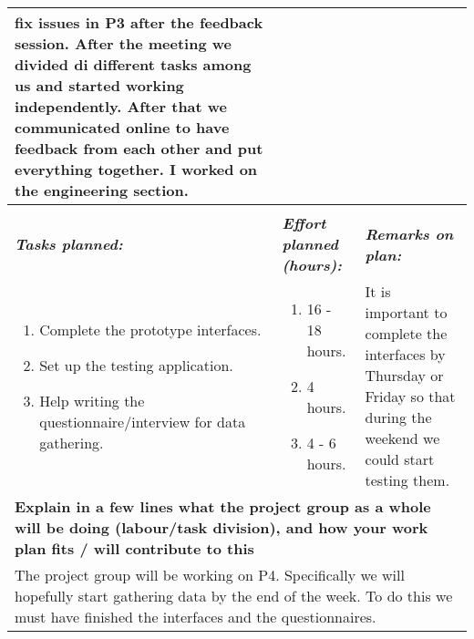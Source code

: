 \documentclass[a4paper]{article}
\begin{document}
\begin{center}
\begin{tabular}{ | p{6cm} | p{6cm} | p{6cm} | p{6cm} | }
{    fix issues in P3 after the feedback session. After the meeting we divided
    di different tasks among us and started working independently. After that
    we communicated online to have feedback from each other and put everything
    together. I worked on the engineering section.} \\
    \hline
    \rowcolor{yellow!25}\multicolumn{4}{|p{24cm}|}{\textbf{Plan for the
    upcoming week:}} \\
    \hline
    \textbf{\textit{Tasks planned:}} &
    \textbf{\textit{Effort planned (hours):}} &
    \multicolumn{2}{|p{12cm}|}{\textbf{\textit{Remarks on plan:}}} \\
    \begin{enumerate}
      \vspace{-6mm}
      \item Complete the prototype interfaces.
      \item Set up the testing application.
      \item Help writing the questionnaire/interview for data gathering.
    \end{enumerate} &
    \begin{enumerate}
      \item 16 - 18 hours.
      \item 4 hours.
      \item 4 - 6 hours.
    \end{enumerate} &
    \multicolumn{2}{|p{12cm}|}{It is important to complete the interfaces by
    Thursday or Friday so that during the weekend we could start testing them.
    } \\
    \hline
    \multicolumn{4}{|p{24cm}|}{\textbf{Explain in a few lines what the project
    group as a whole will be doing (labour/task division), and how your work
    plan fits / will contribute to this}} \\
    \multicolumn{4}{|p{24cm}|}{The project group will be working on P4.
    Specifically we will hopefully start gathering data by the end of the week.
    To do this we must have finished the interfaces and the questionnaires.} \\
    \hline
  \end{tabular}
  \egroup
\end{center}
\end{document}
